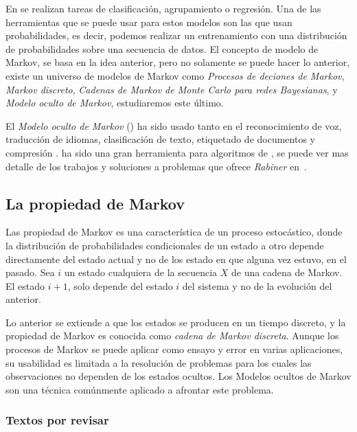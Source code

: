 
En \machinelearning se realizan tareas de clasificación, agrupamiento o regresión. Una de las herramientas que se puede usar para estos modelos son las que usan probabilidades, es decir, podemos realizar un entrenamiento con una distribución de probabilidades sobre una secuencia de datos. El concepto de modelo de Markov, se basa en la idea anterior, pero no solamente se puede hacer lo anterior, existe un universo de modelos de Markov como \emph{Procesos de deciones de Markov}, \emph{Markov discreto}, \emph{Cadenas de Markov de Monte Carlo para redes Bayesianas}, y  \emph{Modelo oculto de Markov}, estudiaremos este último.

El \emph{Modelo oculto de Markov} (\HMM) ha sido usado tanto en el reconocimiento de voz, traducción de idiomas, clasificación de texto, etiquetado de documentos y compresión \MLkhanna. \HMM ha sido una gran herramienta para algoritmos de \machinelearning, se puede ver mas detalle de los trabajos y soluciones a problemas que ofrece \emph{Rabiner} en~\cite{Rabiner1990}.





\subsection{La propiedad de Markov}



Las propiedad de Markov es una característica de un proceso estocástico, donde la distribución de probabilidades condicionales de un estado a otro depende directamente del estado actual y no de los estado en que alguna vez estuvo, en el pasado. Sea $i$ un estado cualquiera de la secuencia $X$ de una cadena de Markov.  El estado $i+1$, solo depende del estado $i$ del sistema y no de la evolución del anterior.


Lo anterior se extiende a que los estados se producen en un tiempo discreto, y la propiedad de Markov es conocida como \emph{cadena de Markov discreta}. Aunque los procesos de Markov se puede aplicar como ensayo y error en varias aplicaciones, su usabilidad es limitada a la resolución de problemas para los cuales las observaciones no dependen de los estados ocultos. Los Modelos ocultos de Markov son una técnica comúnmente aplicado a afrontar este problema.






\subsubsection{Textos por revisar}

